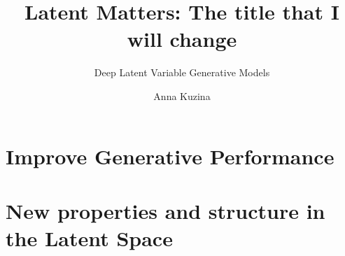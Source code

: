 \documentclass[nobib,justified,titlepage,nofonts,a4paper]{tufte-book}
\author[Anna Kuzina]{Anna Kuzina}
\title{Latent Matters: The title that I will change}
\subtitle{Deep Latent Variable Generative Models}
\begin{document}
\frontmatter
\maketitlepage
\pagestyle{plain}


\tableofcontents


\mainmatter


% 

\listoftodos[Notes]

\part{Improve Generative Performance}



\part{New properties and structure in the Latent Space}









\cleardoublepage
\begin{fullwidth}
\begin{singlespace}
	
	
\end{singlespace}
\end{fullwidth}

\appendix
\newpage
{}







\clearpage
\end{document}
